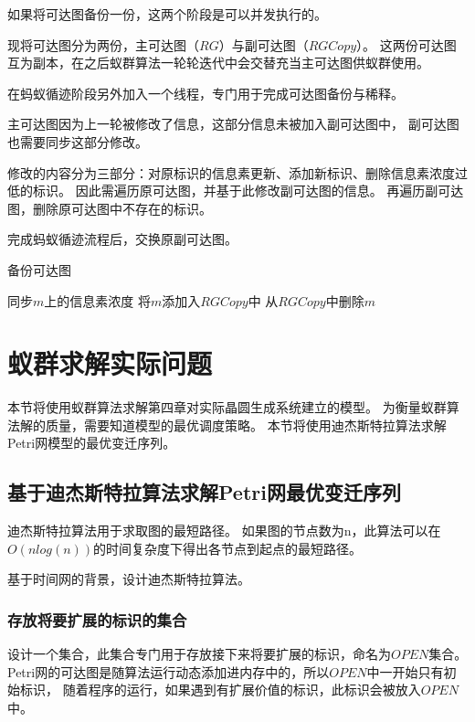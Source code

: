 如果将可达图备份一份，这两个阶段是可以并发执行的。

现将可达图分为两份，主可达图（$RG$）与副可达图（$RGCopy$）。
这两份可达图互为副本，在之后蚁群算法一轮轮迭代中会交替充当主可达图供蚁群使用。

在蚂蚁循迹阶段另外加入一个线程，专门用于完成可达图备份与稀释。

主可达图因为上一轮被修改了信息，这部分信息未被加入副可达图中，
副可达图也需要同步这部分修改。

修改的内容分为三部分：对原标识的信息素更新、添加新标识、删除信息素浓度过低的标识。
因此需遍历原可达图，并基于此修改副可达图的信息。
再遍历副可达图，删除原可达图中不存在的标识。

完成蚂蚁循迹流程后，交换原副可达图。

\begin{algorithm}[H]
	\caption{备份可达图}
	\label{alg4-9}
	\begin{algorithmic}
					\State 同步$m$上的信息素浓度
				\Else
					\State 将$m$添加入$RGCopy$中
				\EndIf
			\EndFor
					\State 从$RGCopy$中删除$m$
				\EndIf
			\EndFor
		\EndProcedure
	\end{algorithmic}
\end{algorithm}

\section{蚁群求解实际问题}
本节将使用蚁群算法求解第四章对实际晶圆生成系统建立的模型。
为衡量蚁群算法解的质量，需要知道模型的最优调度策略。
本节将使用迪杰斯特拉算法求解Petri网模型的最优变迁序列。
\subsection{基于迪杰斯特拉算法求解Petri网最优变迁序列}
迪杰斯特拉算法用于求取图的最短路径。
如果图的节点数为n，此算法可以在$O(nlog(n))$的时间复杂度下得出各节点到起点的最短路径。

基于时间网的背景，设计迪杰斯特拉算法。

\subsubsection{存放将要扩展的标识的集合}
设计一个集合，此集合专门用于存放接下来将要扩展的标识，命名为$OPEN$集合。
Petri网的可达图是随算法运行动态添加进内存中的，所以$OPEN$中一开始只有初始标识，
随着程序的运行，如果遇到有扩展价值的标识，此标识会被放入$OPEN$中。


